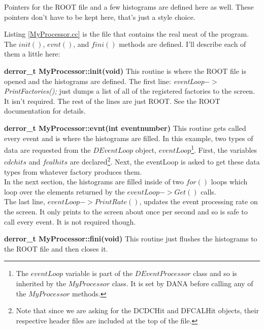 \documentclass[12pt]{article}
\begin{document}
Pointers for the ROOT file and a few histograms are defined
here as well. These pointers don't have to be kept here, that's
just a style choice.



\newpage
Listing \ref{MyProcessor.cc} is the file that contains the real meat
of the program. The $init()$, $evnt()$, and $fini()$ methods
are defined. I'll describe each of them a little here:

\begin{description}
\item{\bf derror\_t MyProcessor::init(void)}
This routine is where the ROOT file is opened and the histograms are
defined. The first line: {\it eventLoop$->$PrintFactories();} just
dumps a list of all of the registered factories to the screen. It isn't
required. The rest of the lines are just ROOT. See the ROOT documentation
for details.

\item{\bf derror\_t MyProcessor::evnt(int eventnumber)}
This routine gets called every event and is where the histograms
are filled. In this example, two types of data are requested from
the $DEventLoop$ object, $eventLoop$\footnote{The $eventLoop$ variable
is part of the $DEventProcessor$ class and so is inherited by
the $MyProcessor$ class. It is set by DANA before calling any of
the $MyProcessor$ methods.}. First, the variables $cdchits$ and
$fcalhits$ are declared\footnote{Note that since we are asking for
the DCDCHit and DFCALHit objects, their respective header files are
included at the top of the file.}. Next, the eventLoop is asked to
get these data types from whatever factory produces them.\\

In the next section, the histograms are filled inside of
two $for()$ loops which loop over the elements returned by
the $eventLoop->Get()$ calls.\\

The last line, $eventLoop->PrintRate()$, updates the event processing
rate on the screen. It only prints to the screen about once per second
and so is safe to call every event. It is not required though.

\item{\bf derror\_t MyProcessor::fini(void)}
This routine just flushes the histograms to the ROOT file and then closes it.
\end{description}


\end{document}

